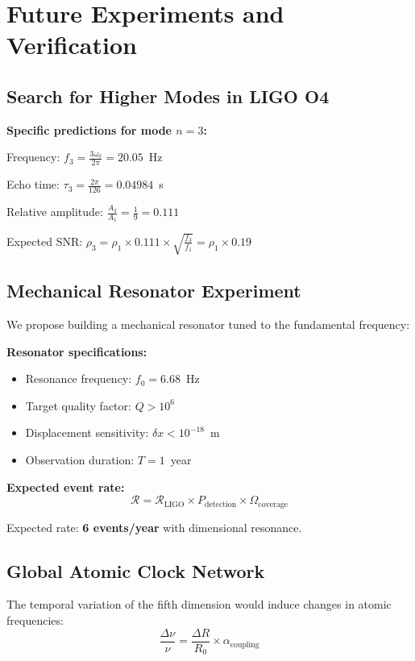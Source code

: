 \documentclass[10pt]{article}
\begin{document}
\section{Future Experiments and Verification}

\subsection{Search for Higher Modes in LIGO O4}

\textbf{Specific predictions for mode $n=3$:}

Frequency: $f_3 = \frac{3\omega_0}{2\pi} = 20.05$~Hz

Echo time: $\tau_3 = \frac{2\pi}{126} = 0.04984$~s

Relative amplitude: $\frac{A_3}{A_1} = \frac{1}{9} = 0.111$

Expected SNR: $\rho_3 = \rho_1 \times 0.111 \times \sqrt{\frac{f_3}{f_1}} = \rho_1 \times 0.19$

\subsection{Mechanical Resonator Experiment}

We propose building a mechanical resonator tuned to the fundamental frequency:

\textbf{Resonator specifications:}
\begin{itemize}[itemsep=0pt]
\item Resonance frequency: $f_0 = 6.68$~Hz
\item Target quality factor: $Q > 10^6$
\item Displacement sensitivity: $\delta x < 10^{-18}$~m
\item Observation duration: $T = 1$~year
\end{itemize}

\textbf{Expected event rate:}
\begin{equation}
\mathcal{R} = \mathcal{R}_{\text{LIGO}} \times P_{\text{detection}} \times \Omega_{\text{coverage}}
\end{equation}

Expected rate: \textbf{6 events/year} with dimensional resonance.

\subsection{Global Atomic Clock Network}

The temporal variation of the fifth dimension would induce changes in atomic frequencies:
\begin{equation}
\frac{\Delta \nu}{\nu} = \frac{\Delta R}{R_0} \times \alpha_{\text{coupling}}
\end{equation}
\end{document}
